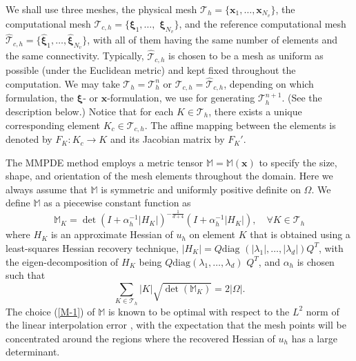 \documentclass{siamart0516}
\def \M{\mathbb{M}}
\newcommand{\bx}{\mathbf{x}}
\newcommand{\bxi}{\bs{\xi}}
\newcommand{\bs}[0]{\boldsymbol}
\theoremstyle{plain}%
\theoremstyle{definition}
\theoremstyle{remark}
\begin{document}
We shall use three meshes, the physical mesh $\mathcal{T}_h = \{ \bx_1, \ldots, \bx_{N_v} \}$,
the computational mesh $\mathcal{T}_{c,h} = \{ \bxi_1,\ldots,$ $\bxi_{N_v} \}$, and
the reference computational mesh $\hat{ \mathcal{T}}_{c,h} = \{ \hat{\bxi}_1,\ldots, \hat{\bxi}_{N_v} \}$,
with all of them having the same number of elements and the same connectivity.
Typically, $\hat{\mathcal{T}}_{c,h}$ is chosen to be a mesh as uniform as possible (under the Euclidean metric)
and kept fixed throughout the computation. We may take $\mathcal{T}_h = \mathcal{T}_h^n$ or
$\mathcal{T}_{c,h} = \hat{ \mathcal{T}}_{c,h}$, depending on which formulation, the $\bxi$- or $\bx$-formulation,
we use for generating $\mathcal{T}_h^{n+1}$. (See the description below.)
Notice that for each $K \in \mathcal{T}_h$, there exists a unique corresponding element $K_c \in \mathcal{T}_{c,h}$.
The affine mapping between the elements is denoted by $F_K: K_c \rightarrow K$ and its Jacobian matrix
by $F_K'$.

The MMPDE method employs a metric tensor $\M = \M(\bx)$ to specify the size, shape, and orientation
of the mesh elements throughout the domain. Here we always assume that $\M$ is symmetric and
uniformly positive definite on $\Omega$. We define $\M$ as a piecewise constant function as
\begin{equation}
\M_K = \det(I + \alpha_h^{-1} |H_K|)^{-\frac{1}{d+4}}(I + \alpha_h^{-1} |H_K|), \quad \forall K \in \mathcal{T}_h
\label{M-1}
\end{equation}
where $H_K$ is an approximate Hessian of $u_h$ on element $K$ that is obtained using
a least-squares Hessian recovery technique,
$|H_K| = Q \text{diag}\,\,(|\lambda_1|,\ldots,|\lambda_d|)Q^T$, with the eigen-decomposition of $H_K$ being
$Q \text{diag}(\lambda_1,\ldots,\lambda_d)$ $Q^T$, and $\alpha_h$ is chosen such that
\[
\sum \limits_{K\in \mathcal{T}_h} |K| \sqrt{\det(\M_K)} = 2 |\Omega| .
\]
The choice (\ref{M-1}) of $\M$ is known to be optimal
with respect to the $L^2$ norm of the linear interpolation error \cite{Hua05b},
with the expectation that the mesh points will be concentrated around the regions where the recovered Hessian
of $u_h$ has a large determinant.
\end{document}
